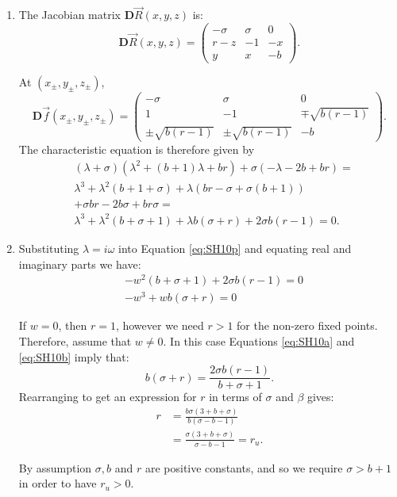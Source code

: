\documentclass[
  a4paper,
  oneside,
  final]{krantz}
\newcommand{\jacob}{{\mathbf{D}}\vec{f}}
\newcommand{\jacobr}{\mathbf{D}\vec{R}}
\theoremstyle{definition}
\theoremstyle{definition}
\theoremstyle{definition}
\theoremstyle{definition}
\theoremstyle{remark}
\begin{document}
\begin{enumerate}
\def\labelenumi{\alph{enumi}.}
\item
  The Jacobian matrix \(\jacobr(x,y,z)\) is:
  \[
   \jacobr(x,y,z) = \begin{pmatrix}
                       -\sigma  & \sigma & 0 \\
                       r-z & -1 & -x \\
                       y & x & - b 
                    \end{pmatrix}.
   \]

  At \((x_{\pm}, y_{\pm}, z_{\pm})\),
  \[
   \jacob(x_{\pm}, y_{\pm}, z_{\pm}) = \begin{pmatrix}
                                           -\sigma & \sigma & 0 \\
                                           1 & -1 & \mp \sqrt{b(r-1)} \\
                                           \pm \sqrt{b(r-1)} & \pm \sqrt{b(r-1)} & -b
                                       \end{pmatrix}.
   \]
  The characteristic equation is therefore given by
  \begin{align}
       &(\lambda + \sigma) \left( \lambda^2 + (b+1) \lambda + br \right) + \sigma (-\lambda - 2b + br) = \nonumber \\
        &\lambda^3 + \lambda^2 ( b+1 + \sigma) + \lambda (br - \sigma + \sigma(b+1)) \nonumber \\ &+ \sigma br -2b \sigma + br \sigma = \nonumber \\
        &\lambda^3 + \lambda^2 (b+\sigma +1) + \lambda b (\sigma + r) + 2\sigma b(r-1) = 0. \label{eq:SH10p}
   \end{align}
\item
  Substituting \(\lambda = i \omega\) into Equation \eqref{eq:SH10p} and equating real and imaginary parts we have:
  \begin{align}
      &-w^2(b+ \sigma +1) + 2\sigma b(r-1) = 0 \label{eq:SH10a} \\
      &-w^3 + w b(\sigma + r)= 0 \label{eq:SH10b}
  \end{align}

  If \(w = 0\), then \(r =1\), however we need \(r > 1\) for the non-zero fixed points. Therefore, assume that \(w \ne 0\). In this case Equations \eqref{eq:SH10a} and \eqref{eq:SH10b} imply that:
  \[
      b(\sigma + r) = \frac{2\sigma b(r-1)}{b + \sigma + 1 }.
  \]
  Rearranging to get an expression for \(r\) in terms of \(\sigma\) and \(\beta\) gives:
  \begin{align*}
      r &= \frac{b\sigma(3 + b + \sigma)}{b(\sigma -b -1)} \\
        &= \frac{\sigma(3 + b + \sigma)}{\sigma -b -1} = r_u.
  \end{align*}

  By assumption \(\sigma, b\) and \(r\) are positive constants, and so we require \(\sigma > b+1\) in order to have \(r_u >0\).
\end{enumerate}
\end{document}
